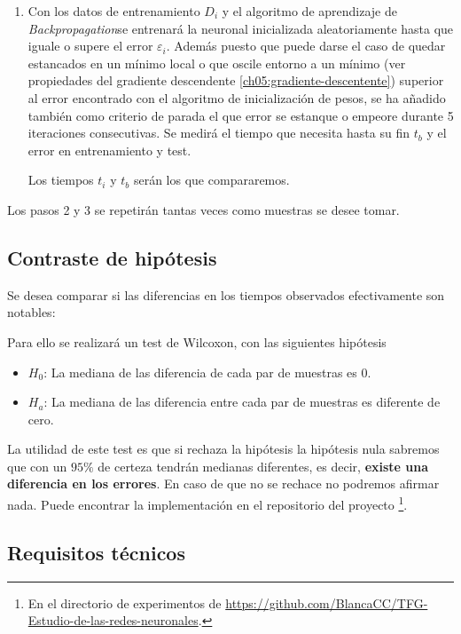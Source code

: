 \begin{enumerate}
\item Con los datos de entrenamiento $D_i$ y el algoritmo de aprendizaje de \textit{Backpropagation}se entrenará la neuronal inicializada aleatoriamente hasta que iguale o supere el error $\varepsilon_i$. Además puesto que puede darse el caso de quedar estancados en un mínimo local  o que oscile entorno a un mínimo (ver propiedades del gradiente descendente \ref{ch05:gradiente-descentente})
superior al error encontrado con el algoritmo de inicialización de pesos, se ha añadido también como criterio de parada el que error se estanque o empeore durante 5 iteraciones consecutivas. 
Se medirá el tiempo que necesita hasta su fin $t_b$ y el error en entrenamiento y test. 

Los tiempos $t_i$ y $t_b$ serán los que compararemos. 
\end{enumerate}

Los pasos 2 y 3 se repetirán tantas veces como 
muestras se desee tomar. 

\subsection{Contraste de hipótesis}

Se desea comparar si las diferencias en los tiempos observados efectivamente son notables: 

Para ello se realizará un test de Wilcoxon, con las siguientes hipótesis

\begin{itemize}
    \item $H_0$: La mediana de las diferencia de cada par de muestras es $0$. 
    \item $H_a$: La mediana de las diferencia entre cada par de muestras es diferente de cero. 
\end{itemize}

La utilidad de este test es que si rechaza la hipótesis la hipótesis nula sabremos que con un $95 \%$ de certeza tendrán medianas diferentes, es decir, \textbf{existe una 
diferencia en los errores}. En caso de que no se rechace no podremos afirmar nada.
Puede encontrar la implementación en el repositorio del
 proyecto \footnote{En el directorio de experimentos 
 de \url{https://github.com/BlancaCC/TFG-Estudio-de-las-redes-neuronales}.}.

\subsection{Requisitos técnicos}  

